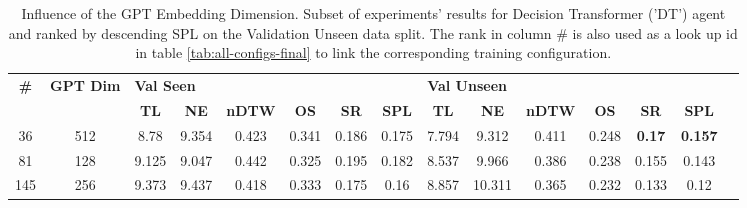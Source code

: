 \begin{table}
\centering
\caption{\label{tab:dt_dim_test}Influence of the GPT Embedding Dimension. Subset of experiments' results for Decision Transformer ('DT') agent and ranked by descending SPL on the Validation Unseen data split. The rank in column \# is also used as a look up id in table \ref{tab:all-configs-final} to link the corresponding training configuration.}
\begin{tabular}{@{\hskip3pt}c@{\hskip3pt}c@{\hskip3pt}c@{\hskip3pt}c@{\hskip3pt}c@{\hskip3pt}c@{\hskip3pt}c@{\hskip3pt}c@{\hskip3pt}c@{\hskip3pt}c@{\hskip3pt}c@{\hskip3pt}c@{\hskip3pt}c@{\hskip3pt}c@{\hskip3pt}c}
\toprule
\textbf{\#} & \textbf{GPT Dim} & \multicolumn{6}{l}{\textbf{Val Seen}} & \multicolumn{6}{l}{\textbf{Val Unseen}} \\
 \textbf{~} &       \textbf{~} &       \textbf{TL} & \textbf{NE} & \textbf{nDTW} & \textbf{OS} & \textbf{SR} & \textbf{SPL} &         \textbf{TL} & \textbf{NE} & \textbf{nDTW} & \textbf{OS} &    \textbf{SR} &    \textbf{SPL} \\
\midrule
         36 &              512 &              8.78 &       9.354 &         0.423 &       0.341 &       0.186 &        0.175 &               7.794 &       9.312 &         0.411 &       0.248 &  \textbf{0.17} &  \textbf{0.157} \\
         81 &              128 &             9.125 &       9.047 &         0.442 &       0.325 &       0.195 &        0.182 &               8.537 &       9.966 &         0.386 &       0.238 &          0.155 &           0.143 \\
        145 &              256 &             9.373 &       9.437 &         0.418 &       0.333 &       0.175 &         0.16 &               8.857 &      10.311 &         0.365 &       0.232 &          0.133 &            0.12 \\
\bottomrule
\end{tabular}
\end{table}
